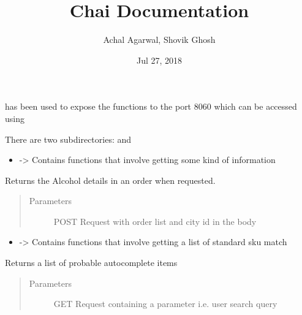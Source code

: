 \documentclass[letterpaper,10pt,english]{sphinxmanual}
\title{Chai Documentation}
\date{Jul 27, 2018}
\author{Achal Agarwal, Shovik Ghosh}
\begin{document}
\maketitle
\sphinxtableofcontents
{}\label{\detokenize{index::doc}}


 has been used to expose the functions to the port 8060 which can be accessed using 

There are two subdirectories:  and 
\begin{itemize}
\item {} 
 -\textgreater{} Contains functions that involve getting some kind of information

\end{itemize}

\begin{fulllineitems}
\label{\detokenize{index:check_alcohol_limit}}
Returns the Alcohol details in an order when requested.
\begin{quote}\begin{description}
\item[{Parameters}] \leavevmode
{} \textendash{} POST Request with order list and city id in the body

\end{description}\end{quote}

\end{fulllineitems}

\begin{itemize}
\item {} 
 -\textgreater{} Contains functions that involve getting a list of standard sku match

\end{itemize}

\begin{fulllineitems}
\label{\detokenize{index:complete_query}}
Returns a list of probable autocomplete items
\begin{quote}\begin{description}
\item[{Parameters}] \leavevmode
{} \textendash{} GET Request containing a parameter i.e. user search query

\end{description}\end{quote}

\end{fulllineitems}
\end{document}
